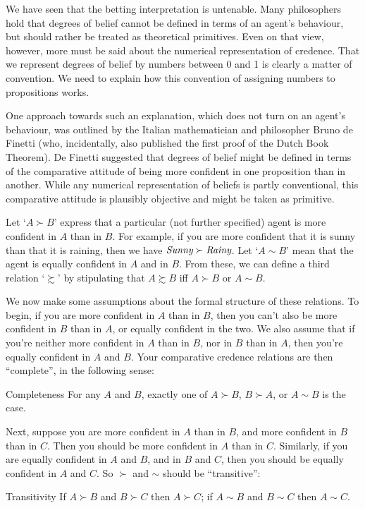 We have seen that the betting interpretation is untenable. Many philosophers
hold that degrees of belief cannot be defined in terms of an agent's behaviour,
but should rather be treated as theoretical primitives. Even on that view,
however, more must be said about the numerical representation of credence. That
we represent degrees of belief by numbers between 0 and 1 is clearly a matter of
convention. We need to explain how this convention of assigning numbers to
propositions works. 

One approach towards such an explanation, which does not turn on an agent's
behaviour, was outlined by the Italian mathematician and philosopher Bruno de
Finetti (who, incidentally, also published the first proof of the Dutch Book
Theorem). De Finetti suggested that degrees of belief might be defined in terms
of the comparative attitude of being more confident in one proposition than in
another. While any numerical representation of beliefs is partly conventional,
this comparative attitude is plausibly objective and might be taken as
primitive.

Let `$A \succ B$' express that a particular (not further specified) agent is
more confident in $A$ than in $B$. For example, if you are more confident that
it is sunny than that it is raining, then we have
$\emph{Sunny} \succ \emph{Rainy}$. Let `$A \sim B$' mean that the agent is
equally confident in $A$ and in $B$. From these, we can define a third relation
`$\succsim$' by stipulating that $A \succsim B$ iff
$A \succ B$ or $A \sim B$.

We now make some assumptions about the formal structure of these relations. To
begin, if you are more confident in $A$ than in $B$, then you can't also be more
confident in $B$ than in $A$, or equally confident in the two. We also assume
that if you're neither more confident in $A$ than in $B$, nor in $B$ than in
$A$, then you're equally confident in $A$ and $B$. Your comparative credence
relations are then ``complete'', in the following sense:

\begin{genericthm}{Completeness}
  For any $A$ and $B$, exactly one of $A \succ B$, $B\succ A$, or $A
  \sim B$ is the case.
\end{genericthm}

Next, suppose you are more confident in $A$ than in $B$, and more confident in
$B$ than in $C$. Then you should be more confident in $A$ than in $C$.
Similarly, if you are equally confident in $A$ and $B$, and in $B$ and $C$, then
you should be equally confident in $A$ and $C$. So $\succ$ and $\sim$ should be
``transitive'':
\begin{genericthm}{Transitivity}
  If $A \succ B$ and $B \succ C$ then $A \succ C$;
  if $A \sim B$ and $B \sim C$ then $A \sim C$.
\end{genericthm}

